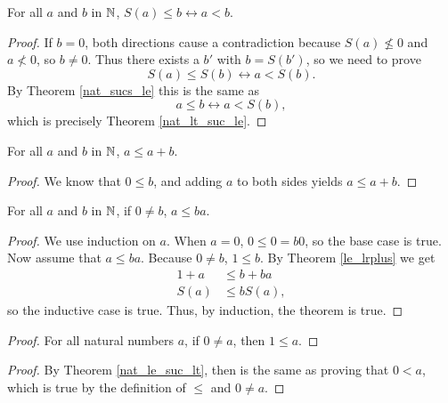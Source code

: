 \documentclass[../math.tex]{subfiles}
\begin{document}
\begin{theorem} \label{nat_le_suc_lt}
    For all $a$ and $b$ in $\mathbb{N}$, $S(a) \leq b \leftrightarrow a < b$.
\end{theorem}
\begin{proof}
    If $b = 0$, both directions cause a contradiction because $S(a) \nleq 0$ and
    $a \nless 0$, so $b \neq 0$.  Thus there exists a $b'$ with $b = S(b')$, so
    we need to prove
    \[
        S(a) \leq S(b) \leftrightarrow a < S(b).
    \]
    By Theorem \ref{nat_sucs_le} this is the same as
    \[
        a \leq b \leftrightarrow a < S(b),
    \]
    which is precisely Theorem \ref{nat_lt_suc_le}.
\end{proof}

\begin{theorem} \label{nat_le_self_lplus}
    For all $a$ and $b$ in $\mathbb{N}$, $a \leq a + b$.
\end{theorem}
\begin{proof}
    We know that $0 \leq b$, and adding $a$ to both sides yields $a \leq a + b$.
\end{proof}

\begin{theorem} \label{nat_le_self_lmult}
    For all $a$ and $b$ in $\mathbb{N}$, if $0 \neq b$, $a \leq ba$.
\end{theorem}
\begin{proof}
    We use induction on $a$.  When $a = 0$, $0 \leq 0 = b0$, so the base case is
    true.  Now assume that $a \leq ba$.  Because $0 \neq b$, $1 \leq b$.  By
    Theorem \ref{le_lrplus} we get
    \begin{align*}
        1 + a &\leq b + ba \\
        S(a) &\leq bS(a),
    \end{align*}
    so the inductive case is true.  Thus, by induction, the theorem is true.
\end{proof}

\begin{proof} \label{nat_neq0_leq1}
    For all natural numbers $a$, if $0 \neq a$, then $1 \leq a$.
\end{proof}
\begin{proof}
    By Theorem \ref{nat_le_suc_lt}, then is the same as proving that $0 < a$,
    which is true by the definition of $\leq$ and $0 \neq a$.
\end{proof}
\end{document}
